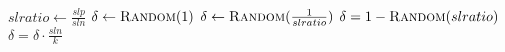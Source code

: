 \begin{algorithm}[t]
\begin{multicols}{2}
\begin{algorithmic}[1]
		\State \Return{$ \delta $}
	\EndIf
	\\
	\State $ slratio \gets \frac{slp}{sln} $
		\State $ \delta \gets \Call{Random}{1} $
		\State $ \delta \gets \Call{Random}{\frac{1}{slratio}} $
	\Else
		\State $ \delta = 1 - \Call{Random}{slratio} $
	\EndIf
	\\
		\State $ \delta = \delta \cdot \frac{sln}{k} $
	\EndIf
	\\
	\State \Return{$ \delta $}
\EndFunction
\end{algorithmic}
\end{multicols}
\end{algorithm}
\restoregeometry
\newpage

